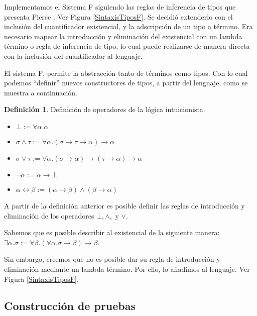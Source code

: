 \documentclass[a4paper,11pt]{article}
\theoremstyle{definition}
\newtheorem{definition}{Definición}
\begin{document}
Implementamos el Sistema F siguiendo las reglas de inferencia de tipos que presenta Pierce \cite{pierce}.
Ver Figura \ref{SintaxisTiposF}.
Se decidió extenderlo con el inclusión del cuantificador existencial, y la adscripción de un tipo a término.
Era necesario mapear la introducción y eliminación del existencial con un lambda término o regla de inferencia de tipo, 
lo cual puede realizarse de manera directa con la inclusión del cuantificador al lenguaje. 

El sistema F, permite la abstracción tanto de términos como tipos. Con lo cual podemos ``definir'' nuevos
constructores de tipos, a partir del lenguaje, como se muestra a continuación.

\begin{definition}
  Definición de operadores de la lógica intuicionista.

  \begin{itemize}
  \item $\bot := \forall \alpha. \alpha$
  \item $\sigma \wedge \tau := \forall \alpha. (\sigma \rightarrow \tau \rightarrow \alpha) \rightarrow \alpha$
  \item $\sigma \vee \tau := \forall \alpha. (\sigma \rightarrow \alpha) \rightarrow (\tau \rightarrow \alpha) \rightarrow \alpha$
  \item $\neg \alpha := \alpha \rightarrow \bot$
  \item $\alpha \leftrightarrow \beta := (\alpha \rightarrow \beta) \wedge (\beta \rightarrow \alpha)$ 
  \end{itemize}
\end{definition}

A partir de la definición anterior es posible definir las reglas de introducción y eliminación
de los operadores $\bot, \wedge,$ y $\vee$.

Sabemos que es posible describir al existencial de la siguiente manera:
$\exists \alpha. \sigma := \forall \beta. (\forall \alpha. \sigma \rightarrow \beta) \rightarrow \beta$.

Sin embargo, creemos que no es posible dar su regla de introducción y eliminación mediante un lambda término.
Por ello, lo añadimos al lenguaje. Ver Figura \ref{SintaxisTiposF}.


\subsection{Construcción de pruebas}
\label{construcciónDePruebas}
\end{document}
